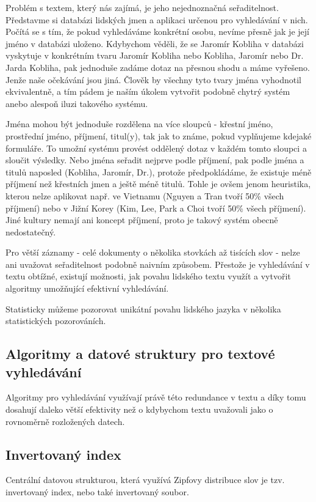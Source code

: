 \documentclass[11pt]{article}
\begin{document}
Problém s textem, který nás zajímá, je jeho nejednoznačná seřaditelnost.
Představme si databázi lidských jmen a aplikaci určenou pro vyhledávání v nich.
Počítá se s tím, že pokud vyhledáváme konkrétní osobu, nevíme přesně jak je
její jméno v databázi uloženo. Kdybychom věděli, že se Jaromír Kobliha v
databázi vyskytuje v konkrétním tvaru Jaromír Kobliha nebo Kobliha, Jaromír
nebo Dr. Jarda Kobliha, pak jednoduše zadáme dotaz na přesnou shodu a máme
vyřešeno. Jenže naše očekávání jsou jiná. Člověk by všechny tyto tvary jména
vyhodnotil ekvivalentně, a tím pádem je naším úkolem vytvořit podobně chytrý
systém anebo alespoň iluzi takového systému. 

Jména mohou být jednoduše rozdělena na více sloupců - křestní jméno, prostřední
jméno, příjmení, titul(y), tak jak to známe, pokud vyplňujeme kdejaké
formuláře. To umožní systému provést oddělený dotaz v každém tomto sloupci a
sloučit výsledky. Nebo jména seřadit nejprve podle příjmení, pak podle jména a
titulů naposled (Kobliha, Jaromír, Dr.), protože předpokládáme, že existuje
méně příjmení než křestních jmen a ještě méně titulů. Tohle je ovšem jenom
heuristika, kterou nelze aplikovat např. ve Vietnamu (Nguyen a Tran tvoří 50\%
všech příjmení) nebo v Jižní Korey (Kim, Lee, Park a Choi tvoří 50\% všech
příjmení). Jiné kultury nemají ani koncept příjmení, proto je takový systém
obecně nedostatečný.

Pro větší záznamy - celé dokumenty o několika stovkách až tisících slov - nelze
ani uvažovat seřaditelnost podobně naivním způsobem. Přestože je vyhledávání v
textu obtížné, existují možnosti, jak povahu lidského textu využít a vytvořit
algoritmy umožňující efektivní vyhledávání.

Statisticky můžeme pozorovat unikátní povahu lidského jazyka v několika statistických pozorováních.

\subsection{Algoritmy a datové struktury pro textové vyhledávání}
Algoritmy pro vyhledávání využívají právě této redundance v textu a díky tomu
dosahují daleko větší efektivity než o kdybychom textu uvažovali jako o
rovnoměrně rozložených datech.

\subsection{Invertovaný index}
Centrální datovou strukturou, která využívá Zipfovy distribuce slov je tzv.
invertovaný index, nebo také invertovaný soubor.
\end{document}
